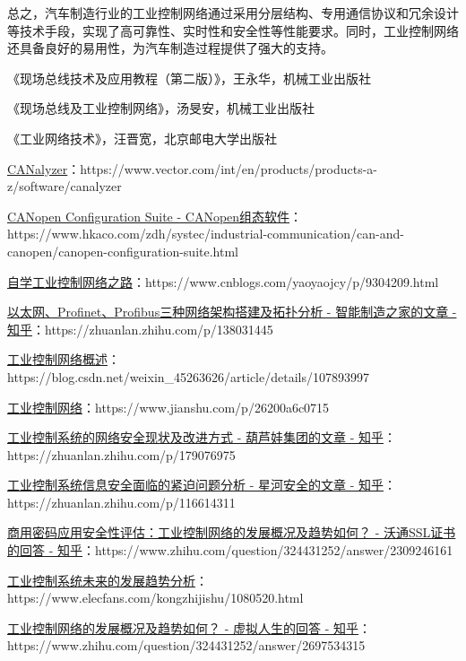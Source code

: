 \documentclass[UTF8]{article}
\begin{document}
总之，汽车制造行业的工业控制网络通过采用分层结构、专用通信协议和冗余设计等技术手段，实现了高可靠性、实时性和安全性等性能要求。同时，工业控制网络还具备良好的易用性，为汽车制造过程提供了强大的支持。

\begin{thebibliography}{99}  
	 《现场总线技术及应用教程（第二版）》，王永华，机械工业出版社

	 《现场总线及工业控制网络》，汤旻安，机械工业出版社

	 《工业网络技术》，汪晋宽，北京邮电大学出版社

	 \href{https://www.vector.com/int/en/products/products-a-z/software/canalyzer/#}{CANalyzer}：https://www.vector.com/int/en/products/products-a-z/software/canalyzer

	 \href{https://www.hkaco.com/zdh/systec/industrial-communication/can-and-canopen/canopen-configuration-suite.html}{CANopen Configuration Suite - CANopen组态软件}：https://www.hkaco.com/zdh/systec/industrial-communication/can-and-canopen/canopen-configuration-suite.html

	 \href{https://www.cnblogs.com/yaoyaojcy/p/9304209.html}{自学工业控制网络之路}：https://www.cnblogs.com/yaoyaojcy/p/9304209.html

	 \href{https://zhuanlan.zhihu.com/p/138031445}{以太网、Profinet、Profibus三种网络架构搭建及拓扑分析 - 智能制造之家的文章 - 知乎}：https://zhuanlan.zhihu.com/p/138031445

	 \href{https://blog.csdn.net/weixin_45263626/article/details/107893997}{工业控制网络概述}：https://blog.csdn.net/weixin\_45263626/article/details/107893997

	 \href{https://www.jianshu.com/p/26200a6c0715}{工业控制网络}：https://www.jianshu.com/p/26200a6c0715

	 \href{https://zhuanlan.zhihu.com/p/179076975}{工业控制系统的网络安全现状及改进方式 - 葫芦娃集团的文章 - 知乎}：https://zhuanlan.zhihu.com/p/179076975

	 \href{https://zhuanlan.zhihu.com/p/116614311}{工业控制系统信息安全面临的紧迫问题分析 - 星河安全的文章 - 知乎}：https://zhuanlan.zhihu.com/p/116614311
	
	 \href{https://www.zhihu.com/question/324431252/answer/2309246161}{商用密码应用安全性评估：工业控制网络的发展概况及趋势如何？ - 沃通SSL证书的回答 - 知乎}：https://www.zhihu.com/question/324431252/answer/2309246161

	 \href{https://www.elecfans.com/kongzhijishu/1080520.html}{工业控制系统未来的发展趋势分析}：https://www.elecfans.com/kongzhijishu/1080520.html

	 \href{https://www.zhihu.com/question/324431252/answer/2697534315}{工业控制网络的发展概况及趋势如何？ - 虚拟人生的回答 - 知乎}：https://www.zhihu.com/question/324431252/answer/2697534315

\end{thebibliography}
\end{document}

